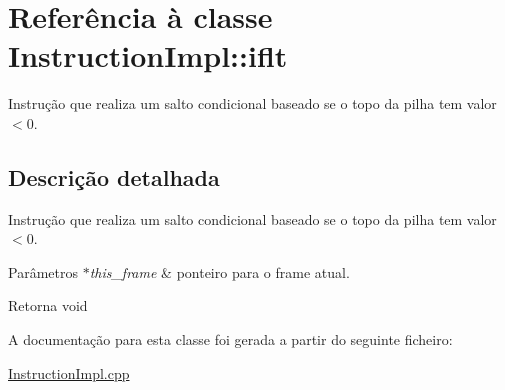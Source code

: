 \hypertarget{class_instruction_impl_1_1iflt}{}\section{Referência à classe Instruction\+Impl\+:\+:iflt}
\label{class_instruction_impl_1_1iflt}


Instrução que realiza um salto condicional baseado se o topo da pilha tem valor $<$0.  




\subsection{Descrição detalhada}
Instrução que realiza um salto condicional baseado se o topo da pilha tem valor $<$0. 


\begin{DoxyParams}{Parâmetros}
{\em $\ast$this\+\_\+frame} & ponteiro para o frame atual. \\
\hline
\end{DoxyParams}
\begin{DoxyReturn}{Retorna}
void 
\end{DoxyReturn}


A documentação para esta classe foi gerada a partir do seguinte ficheiro\+:\begin{DoxyCompactItemize}
\item 
\hyperlink{_instruction_impl_8cpp}{Instruction\+Impl.\+cpp}\end{DoxyCompactItemize}

